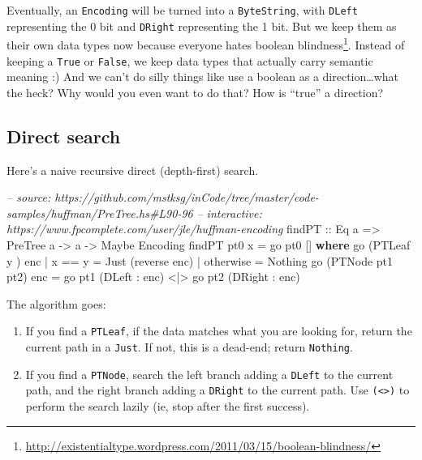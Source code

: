 \documentclass[]{article}
\newenvironment{Shaded}{\begin{snugshade}}{\end{snugshade}}
\newcommand{\CommentTok}[1]{\textcolor[rgb]{0.56,0.35,0.01}{\textit{#1}}}
\newcommand{\DataTypeTok}[1]{\textcolor[rgb]{0.13,0.29,0.53}{#1}}
\newcommand{\FunctionTok}[1]{\textcolor[rgb]{0.00,0.00,0.00}{#1}}
\newcommand{\KeywordTok}[1]{\textcolor[rgb]{0.13,0.29,0.53}{\textbf{#1}}}
\newcommand{\NormalTok}[1]{#1}
\newcommand{\OtherTok}[1]{\textcolor[rgb]{0.56,0.35,0.01}{#1}}
\renewcommand{\href}[2]{#2\footnote{\url{#1}}}
\begin{document}
Eventually, an \texttt{Encoding} will be turned into a \texttt{ByteString}, with
\texttt{DLeft} representing the 0 bit and \texttt{DRight} representing the 1
bit. But we keep them as their own data types now because everyone hates
\href{http://existentialtype.wordpress.com/2011/03/15/boolean-blindness/}{boolean
blindness}. Instead of keeping a \texttt{True} or \texttt{False}, we keep data
types that actually carry semantic meaning :) And we can't do silly things like
use a boolean as a direction\ldots{}what the heck? Why would you even want to do
that? How is ``true'' a direction?

\hypertarget{direct-search}{%
\subsection{Direct search}\label{direct-search}}

Here's a naive recursive direct (depth-first) search.

\begin{Shaded}
\begin{Highlighting}[]
\CommentTok{-- source: https://github.com/mstksg/inCode/tree/master/code-samples/huffman/PreTree.hs#L90-96}
\CommentTok{-- interactive: https://www.fpcomplete.com/user/jle/huffman-encoding}
\OtherTok{findPT ::} \DataTypeTok{Eq}\NormalTok{ a }\OtherTok{=>} \DataTypeTok{PreTree}\NormalTok{ a }\OtherTok{->}\NormalTok{ a }\OtherTok{->} \DataTypeTok{Maybe} \DataTypeTok{Encoding}
\NormalTok{findPT pt0 x }\FunctionTok{=}\NormalTok{ go pt0 []}
  \KeywordTok{where}
\NormalTok{    go (}\DataTypeTok{PTLeaf}\NormalTok{ y      ) enc }\FunctionTok{|}\NormalTok{ x }\FunctionTok{==}\NormalTok{ y    }\FunctionTok{=} \DataTypeTok{Just}\NormalTok{ (reverse enc)}
                            \FunctionTok{|}\NormalTok{ otherwise }\FunctionTok{=} \DataTypeTok{Nothing}
\NormalTok{    go (}\DataTypeTok{PTNode}\NormalTok{ pt1 pt2) enc }\FunctionTok{=}\NormalTok{ go pt1 (}\DataTypeTok{DLeft}  \FunctionTok{:}\NormalTok{ enc) }\FunctionTok{<|>}
\NormalTok{                              go pt2 (}\DataTypeTok{DRight} \FunctionTok{:}\NormalTok{ enc)}
\end{Highlighting}
\end{Shaded}

The algorithm goes:

\begin{enumerate}
\def\labelenumi{\arabic{enumi}.}
\item
  If you find a \texttt{PTLeaf}, if the data matches what you are looking for,
  return the current path in a \texttt{Just}. If not, this is a dead-end; return
  \texttt{Nothing}.
\item
  If you find a \texttt{PTNode}, search the left branch adding a \texttt{DLeft}
  to the current path, and the right branch adding a \texttt{DRight} to the
  current path. Use \texttt{(\textless{}\textbar{}\textgreater{})} to perform
  the search lazily (ie, stop after the first success).
\end{enumerate}
\end{document}
